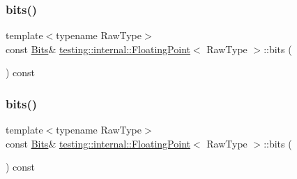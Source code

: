 \mbox{\label{classtesting_1_1internal_1_1_floating_point_aab053be914bdc9e507c0db89740c318c}} 
\subsubsection{\texorpdfstring{bits()}{bits()}\hspace{0.1cm}{\footnotesize\ttfamily [2/3]}}
{\footnotesize\ttfamily template$<$typename Raw\+Type$>$ \\
const \mbox{\hyperlink{classtesting_1_1internal_1_1_floating_point_abf228bf6cd48f12c8b44c85b4971a731}{Bits}}\& \mbox{\hyperlink{classtesting_1_1internal_1_1_floating_point}{testing\+::internal\+::\+Floating\+Point}}$<$ Raw\+Type $>$\+::bits (\begin{DoxyParamCaption}{ }\end{DoxyParamCaption}) const\hspace{0.3cm}{\ttfamily [inline]}}

\mbox{\label{classtesting_1_1internal_1_1_floating_point_aab053be914bdc9e507c0db89740c318c}} 
\subsubsection{\texorpdfstring{bits()}{bits()}\hspace{0.1cm}{\footnotesize\ttfamily [3/3]}}
{\footnotesize\ttfamily template$<$typename Raw\+Type$>$ \\
const \mbox{\hyperlink{classtesting_1_1internal_1_1_floating_point_abf228bf6cd48f12c8b44c85b4971a731}{Bits}}\& \mbox{\hyperlink{classtesting_1_1internal_1_1_floating_point}{testing\+::internal\+::\+Floating\+Point}}$<$ Raw\+Type $>$\+::bits (\begin{DoxyParamCaption}{ }\end{DoxyParamCaption}) const\hspace{0.3cm}{\ttfamily [inline]}}

